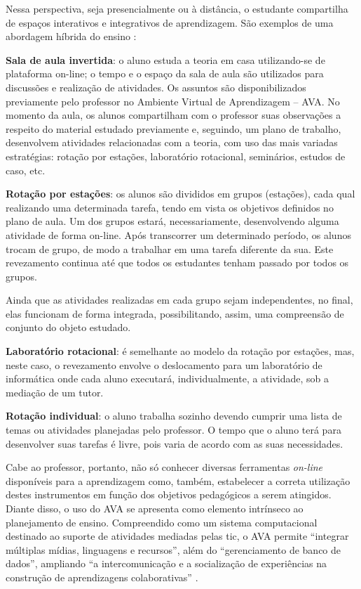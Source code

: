 \documentclass[
	12pt,				%
	openright,			%
  oneside,     %
	a4paper,			%
 hyphens,
	chapter=TITLE,		%
	english,			%
	french,				%
	spanish,			%
	brazil				%
	]{abntex2}
\begin{document}
Nessa perspectiva, seja presencialmente ou à distância, o estudante compartilha de espaços interativos e integrativos de aprendizagem. São exemplos de uma abordagem híbrida do ensino \cite{bacich2015ensino}:

\noindent \textbf{Sala de aula invertida}: o aluno estuda a teoria em casa utilizando-se de plataforma on-line; o tempo e o espaço da sala de aula são utilizados para discussões e realização de atividades. Os assuntos são disponibilizados previamente pelo professor no Ambiente Virtual de Aprendizagem – AVA. No momento da aula, os alunos compartilham com o professor suas observações a respeito do material estudado previamente e, seguindo, um plano de trabalho, desenvolvem atividades relacionadas com a teoria, com uso das mais variadas estratégias: rotação por estações, laboratório rotacional, seminários, estudos de caso, etc.

\noindent \textbf{Rotação por estações}: os alunos são divididos em grupos (estações), cada qual realizando uma determinada tarefa, tendo em vista os objetivos definidos no plano de aula. Um dos grupos estará, necessariamente, desenvolvendo alguma atividade de forma on-line. Após transcorrer um determinado período, os alunos trocam de grupo, de modo a trabalhar em uma tarefa diferente da sua. Este revezamento continua até que todos os estudantes tenham passado por todos os grupos. 

Ainda que as atividades realizadas em cada grupo sejam independentes, no final, elas funcionam de forma integrada, possibilitando, assim, uma compreensão de conjunto do objeto estudado.

\noindent \textbf{Laboratório rotacional}: é semelhante ao modelo da rotação por estações, mas, neste caso, o revezamento envolve o deslocamento para um laboratório de informática onde cada aluno executará, individualmente, a atividade, sob a mediação de um tutor.

\noindent \textbf{Rotação individual}: o aluno trabalha sozinho devendo cumprir uma lista de temas ou atividades planejadas pelo professor. O tempo que o aluno terá para desenvolver suas tarefas é livre, pois varia de acordo com as suas necessidades.

Cabe ao professor, portanto, não só conhecer diversas ferramentas \textit{on-line} disponíveis para a aprendizagem como, também, estabelecer a correta utilização destes instrumentos em função dos objetivos pedagógicos a serem atingidos. Diante disso, o uso do AVA se apresenta como elemento intrínseco ao planejamento de ensino. Compreendido como um sistema computacional destinado ao suporte de atividades mediadas pelas \acrshort{tic}, o AVA permite ``integrar múltiplas mídias, linguagens e recursos'', além do ``gerenciamento de banco de dados'', ampliando ``a intercomunicação e a socialização de experiências na construção de aprendizagens colaborativas'' \cite[p.~2]{silva2013interfaces} \cite{fidem2017agencia}.
	
\end{document}
